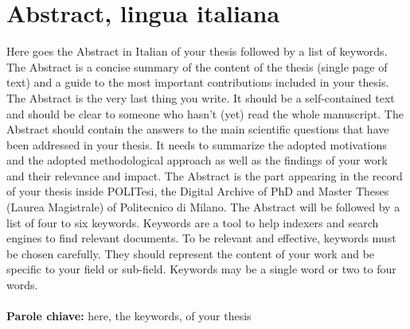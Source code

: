 \chapter*{Abstract, lingua italiana}
Here goes the Abstract in Italian of your thesis followed by a list of keywords.
The Abstract is a concise summary of the content of the thesis (single page of text)
and a guide to the most important contributions included in your thesis.
The Abstract is the very last thing you write.
It should be a self-contained text and should be clear to someone who hasn't (yet) read the whole manuscript.
The Abstract should contain the answers to the main scientific questions that have been addressed in your thesis.
It needs to summarize the adopted motivations and the adopted methodological approach as well as the findings of your work and their relevance and impact.
The Abstract is the part appearing in the record of your thesis inside POLITesi,
the Digital Archive of PhD and Master Theses (Laurea Magistrale) of Politecnico di Milano.
The Abstract will be followed by a list of four to six keywords.
Keywords are a tool to help indexers and search engines to find relevant documents.
To be relevant and effective, keywords must be chosen carefully.
They should represent the content of your work and be specific to your field or sub-field.
Keywords may be a single word or two to four words.
\\
\\
\textbf{Parole chiave:} here, the keywords, of your thesis %

\newpage
\thispagestyle{empty}


\thispagestyle{empty}
\tableofcontents %
\thispagestyle{empty}
\cleardoublepage
\listoftables
\listoffigures

\mainmatter 
